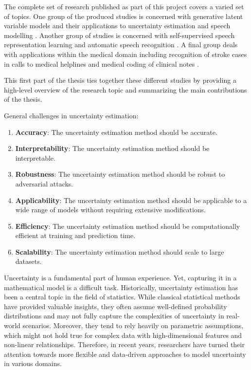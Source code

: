 The complete set of research published as part of this project covers a varied set of topics. One group of the produced studies is concerned with generative latent variable models and their applications to uncertainty estimation and speech modelling \cite{havtorn_hierarchical_2021,havtorn_benchmarking_2022,bergamin_modelagnostic_2022}. Another group of studies is concerned with self-supervised speech representation learning and automatic speech recognition \cite{borgholt_scaling_2021,borgholt_we_2021,mohamed_selfsupervised_2022,borgholt_brief_2022}. A final group deals with applications within the medical domain including recognition of stroke cases in calls to medical helplines \cite{wenstrup_retrospective_2023} and medical coding of clinical notes \cite{edin_automated_2023}. 

This first part of the thesis ties together these different studies by providing a high-level overview of the research topic and summarizing the main contributions of the thesis.



\iffalse

General challenges in uncertainty estimation:
\begin{enumerate}
    \item \textbf{Accuracy}: The uncertainty estimation method should be accurate.
    \item \textbf{Interpretability}: The uncertainty estimation method should be interpretable.
    \item \textbf{Robustness}: The uncertainty estimation method should be robust to adversarial attacks.
    \item \textbf{Applicability}: The uncertainty estimation method should be applicable to a wide range of models without requiring extensive modifications.
    \item \textbf{Efficiency}: The uncertainty estimation method should be computationally efficient at training and prediction time.
    \item \textbf{Scalability}: The uncertainty estimation method should scale to large datasets.
\end{enumerate}







Uncertainty is a fundamental part of human experience. Yet, capturing it in a mathematical model is a difficult task. Historically, uncertainty estimation has been a central topic in the field of statistics. While classical statistical methods have provided valuable insights, they often assume well-defined probability distributions and may not fully capture the complexities of uncertainty in real-world scenarios. Moreover, they tend to rely heavily on parametric assumptions, which might not hold true for complex data with high-dimensional features and non-linear relationships. Therefore, in recent years, researchers have turned their attention towards more flexible and data-driven approaches to model uncertainty in various domains.


